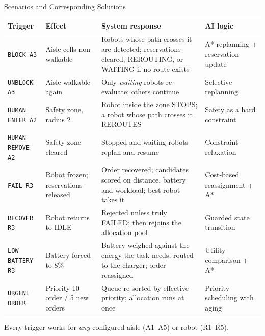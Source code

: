 \documentclass[aspectratio=169,10pt,xcolor=table]{beamer}
\newcommand{\cmd}[1]{{\color{AmritaMaroon}\texttt{#1}}}
\newcommand{\hcell}[1]{{\color{white}\bfseries #1}}
\begin{document}
\begin{frame}{Scenarios and Corresponding Solutions}
\centering
\vspace{-1mm}

\vspace{1.5mm}
\setlength{\tabcolsep}{3pt}
\renewcommand{\arraystretch}{1.05}
\scriptsize
\begin{tabular}{@{}L{2.3cm} L{2.9cm} L{4.5cm} L{3.0cm}@{}}
\toprule
{}
\hcell{Trigger} & \hcell{Effect} & \hcell{System response} & \hcell{AI logic}\\
\midrule
{}
\cmd{BLOCK A3} & Aisle cells non-walkable &
Robots whose path crosses it are detected; reservations cleared; REROUTING, or WAITING if no route exists &
A* replanning + reservation update\\

\cmd{UNBLOCK A3} & Aisle walkable again &
Only \emph{waiting} robots re-evaluate; others continue &
Selective replanning\\

\cmd{HUMAN ENTER A2} & Safety zone, radius 2 &
Robot inside the zone STOPS; a robot whose path crosses it REROUTES &
Safety as a hard constraint\\

\cmd{HUMAN REMOVE A2} & Safety zone cleared &
Stopped and waiting robots replan and resume &
Constraint relaxation\\

\cmd{FAIL R3} & Robot frozen; reservations released &
Order recovered; candidates scored on distance, battery and workload; best robot takes it &
Cost-based reassignment + A*\\

\cmd{RECOVER R3} & Robot returns to IDLE &
Rejected unless truly FAILED; then rejoins the allocation pool &
Guarded state transition\\

\cmd{LOW BATTERY R3} & Battery forced to $8\%$ &
Battery weighed against the energy the task needs; routed to the charger; order reassigned &
Utility comparison + A*\\

\cmd{URGENT ORDER}\newline\cmd{ORDER SURGE} & Priority-10 order / 5 new orders &
Queue re-sorted by effective priority; allocation runs at once &
Priority scheduling with aging\\
\bottomrule
\end{tabular}

\vspace{2pt}
{\scriptsize\color{MidGray} Every trigger works for \emph{any} configured aisle (A1--A5) or robot (R1--R5).}
\end{frame}
\end{document}
